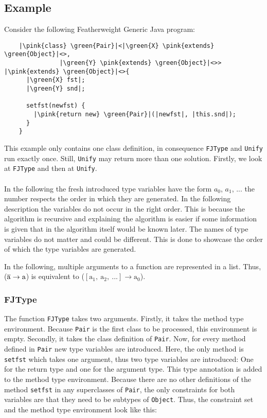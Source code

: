 \newpage
\subsection{Example}

Consider the following Featherweight Generic Java program:

\begin{verbatim}
    |\pink{class} \green{Pair}|<|\green{X} \pink{extends} \green{Object}|<>,
               |\green{Y} \pink{extends} \green{Object}|<>> |\pink{extends} \green{Object}|<>{
      |\green{X} fst|;
      |\green{Y} snd|;

      setfst(newfst) {
        |\pink{return new} \green{Pair}|(|newfst|, |this.snd|);
      }
    }
\end{verbatim}

This example only contains one class definition, in consequence \verb|FJType| and \verb|Unify| run exactly once. Still, \verb|Unify| may return more than one solution.
Firstly, we look at \verb|FJType| and then at \verb|Unify|.
\\
\\
In the following the fresh introduced type variables have the form $a_0$, $a_1$, ... the number respects the order in which they are generated. In the following description the variables do not occur in the right order. This is because the algorithm is recursive and explaining the algorithm is easier
if some information is given that in the algorithm itself would be known later. The names of type variables do not matter and could be different. This is done to showcase the order of which the type variables are generated.

In the following, multiple arguments to a function are represented in a list. Thus, ($\overline{\text{a}} \to \text{a}$) is equivalent to ($[\text{a}_1, \ \text{a}_2, \ ...] \to \text{a}_0$).

\subsubsection{FJType}
The function \verb|FJType| takes two arguments. Firstly, it takes the method type environment. Because \verb|Pair| is the first class to be processed, this environment is empty. Secondly, it takes the class definition of \verb|Pair|.
Now, for every method defined in \verb|Pair| new type variables are introduced. Here, the only method is \verb|setfst| which takes one argument, thus two type variables are introduced: One for the return type and one for the argument type. This type annotation is added to the method type environment.
Because there are no other definitions of the method \verb|setfst| in any superclasses of \verb|Pair|, the only constraints for both variables are that they need to be subtypes of \verb|Object|. Thus, the constraint set and the method type environment look like this:

